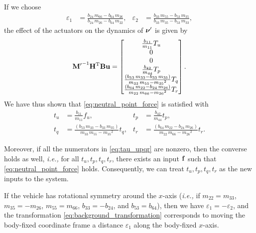 If we choose
\begin{align}
    \varepsilon_1 &= \frac{b_{24}\,m_{66}-b_{64}\,m_{26}}{b_{24}\,m_{26}-b_{64}\,m_{22}}, &
    \varepsilon_2 &= \frac{b_{33}\,m_{55}-b_{53}\,m_{35}}{b_{33}\,m_{35}-b_{53}\,m_{33}},
\end{align}
the effect of the actuators on the dynamics of $\bm{\nu}^{\prime}$ is given by
\begin{equation}
    {\mathbf{M}^{\prime}}^{-1}\mathbf{H}^{\mathrm{T}}\mathbf{B}\mathbf{u} =
    \begin{bmatrix}
        \frac{b_{11}}{m_{11}} T_{u} \\
        0 \\ 
        0 \\ 
        \frac{b_{42}}{m_{44}} T_{p} \\ 
        \frac{\left(b_{53}\,m_{33}-b_{33}\,m_{35}\right)}{m_{33}\,m_{55}-{m_{35}}^2} T_{q} \\ 
        \frac{\left(b_{64}\,m_{22}-b_{24}\,m_{26}\right)}{m_{22}\,m_{66}-{m_{26}}^2} T_{r}
    \end{bmatrix}.
\end{equation}
We have thus shown that \eqref{eq:neutral_point_force} is satisfied with
\begin{subequations}
    \begin{align}
        t_u &= \frac{b_{11}}{m_{11}} f_{u}, &
        t_p &= \frac{b_{42}}{m_{44}} t_{p}, \\
        t_q &= \frac{\left(b_{53}\,m_{33}-b_{33}\,m_{35}\right)}{m_{33}\,m_{55}-{m_{35}}^2} t_{q}, &
        t_r &= \frac{\left(b_{64}\,m_{22}-b_{24}\,m_{26}\right)}{m_{22}\,m_{66}-{m_{26}}^2} t_{r}.
    \end{align} 
    \label{eq:tau_upqr}
\end{subequations}

\noindent Moreover, if all the numerators in \eqref{eq:tau_upqr} are nonzero, then the converse holds as well, \emph{i.e.,} for all $t_u, t_p, t_q, t_r$, there exists an input $\mathbf{f}$ such that \eqref{eq:neutral_point_force} holds.
Consequently, we can treat $t_u, t_p, t_q, t_r$ as the new inputs to the system.

\begin{rmk}
    If the vehicle has rotational symmetry around the $x$-axis (\emph{i.e.,} if $m_{22} = m_{33}$, $m_{35} = -m_{26}$, $m_{55} = m_{66}$, $b_{33} = -b_{24}$, and $b_{53} = b_{64}$), then we have $\varepsilon_1 = -\varepsilon_2$, and the transformation \eqref{eq:background_transformation} corresponds to moving the body-fixed coordinate frame a distance $\varepsilon_1$ along the body-fixed $x$-axis.
\end{rmk}


